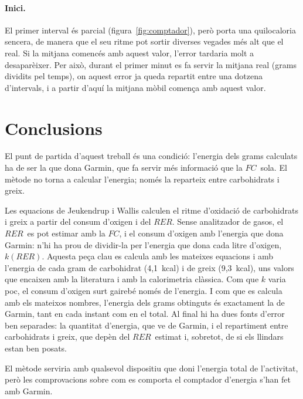 \documentclass[10pt,a4paper]{article}
\newcommand{\RER}{\ensuremath{\mathit{RER}}}
\newcommand{\FC}{\ensuremath{\mathit{FC}}}
\begin{document}
\paragraph{Inici.} El primer interval és parcial (figura~\ref{fig:comptador}), però porta
una quilocaloria sencera, de manera que el seu ritme pot sortir diverses vegades més alt
que el real. Si la mitjana comencés amb aquest valor, l'error tardaria molt a desaparèixer.
Per això, durant el primer minut es fa servir la mitjana real (grams dividits pel temps),
on aquest error ja queda repartit entre una dotzena d'intervals, i a partir d'aquí la mitjana
mòbil comença amb aquest valor.

\section{Conclusions}

El punt de partida d'aquest treball és una condició: l'energia dels grams calculats ha de
ser la que dona Garmin, que fa servir més informació que la \FC\ sola. El mètode no torna a
calcular l'energia; només la reparteix entre carbohidrats i greix.

Les equacions de Jeukendrup i Wallis calculen el ritme d'oxidació de carbohidrats i greix
a partir del consum d'oxigen i del \RER. Sense analitzador de gasos, el \RER\ es pot
estimar amb la \FC, i el consum d'oxigen amb l'energia que dona Garmin: n'hi ha prou de
dividir-la per l'energia que dona cada litre d'oxigen, $k(\RER)$. Aquesta peça clau es
calcula amb les mateixes equacions i amb l'energia de cada gram de carbohidrat (4,1~kcal)
i de greix (9,3~kcal), uns valors que encaixen amb la literatura i amb la calorimetria
clàssica. Com que $k$ varia poc, el consum d'oxigen surt gairebé només de l'energia. I com
que es calcula amb els mateixos nombres, l'energia dels grams obtinguts és exactament la de
Garmin, tant en cada instant com en el total. Al final hi ha dues fonts d'error ben
separades: la quantitat d'energia, que ve de Garmin, i el repartiment entre carbohidrats i
greix, que depèn del \RER\ estimat i, sobretot, de si els llindars estan ben posats.

El mètode serviria amb qualsevol dispositiu que doni l'energia total de l'activitat, però
les comprovacions sobre com es comporta el comptador d'energia s'han fet amb Garmin.
\end{document}
